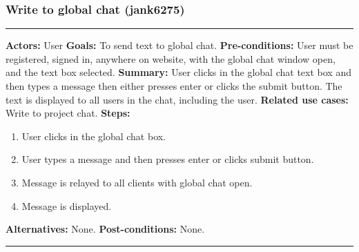 \documentclass[11pt]{report}
\begin{document}
\subsubsection{Write to global chat (jank6275)}
\vspace{2pt}
\hrule
\vspace{8pt}
 \textbf{Actors:} User \newline
\textbf{Goals:} To send text to global chat. \newline
 \textbf{Pre-conditions:} User must be registered, signed in, anywhere on website, with the global chat window open, and the text box selected.  \newline
 \textbf{Summary:} User clicks in the global chat text box and then types a message then either presses enter or clicks the submit button. The text is displayed to all users in the chat, including the user. \newline
\textbf{Related use cases:} Write to project chat. \newline
\textbf{Steps:} \begin{enumerate}
  \item User clicks in the global chat box.
  \item User types a message and then presses enter or clicks submit button.
  \item Message is relayed to all clients with global chat open.
  \item Message is displayed.
 \end{enumerate}
 \textbf{Alternatives:} None. \newline
 \textbf{Post-conditions:} None. \newline
\vspace{8pt}
\hrule
\newpage
\end{document}
